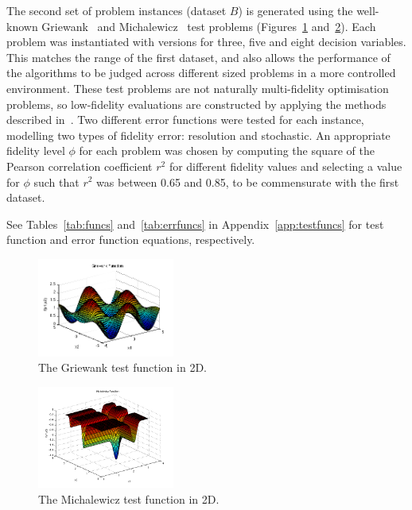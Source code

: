 The second set of problem instances (dataset $B$) is generated using the well-known Griewank~\cite{griewank1981generalized} and Michalewicz~\cite{michalewicz2013genetic} test problems (Figures~\ref{fig:grie} and~\ref{fig:michal}). Each problem was instantiated with versions for three, five and eight decision variables. This matches the range of the first dataset, and also allows the performance of the algorithms to be judged across different sized problems in a more controlled environment. These test problems are not naturally multi-fidelity optimisation problems, so low-fidelity evaluations are constructed by applying the methods described in~\cite{wang2017generic}. Two different error functions were tested for each instance, modelling two types of fidelity error: resolution and stochastic. An appropriate fidelity level $\phi$ for each problem was chosen by computing the square of the Pearson correlation coefficient $r^2$ for different fidelity values and selecting a value for $\phi$ such that $r^2$ was between 0.65 and 0.85, to be commensurate with the first dataset.

See Tables~\ref{tab:funcs} and~\ref{tab:errfuncs} in Appendix~\ref{app:testfuncs} for test function and error function equations, respectively.

\begin{figure}[h!]
  \centering
  \includegraphics[width = 0.40\textwidth]{img/griewank.png} 
  \caption{The Griewank test function in 2D.} 
    \label{fig:grie}
\end{figure}
\begin{figure}[h!]
  \centering
  \includegraphics[width = 0.40\textwidth]{img/michal.png} 
  \caption{The Michalewicz test function in 2D.} 
    \label{fig:michal}
\end{figure}

